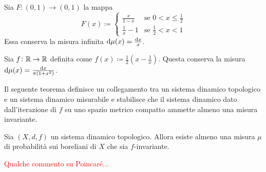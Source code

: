 \begin{exercise}
    Sia $ F\colon (0,1)\to (0,1) $ la mappa
    \[
        F(x) \coloneqq
        \begin{cases}
            \frac{x}{1-x}   & \text{se } 0 < x \leq \frac{1}{2} \\
            \frac{1}{x} - 1 & \text{se } \frac{1}{2} < x < 1
        \end{cases}
    \]
    Essa conserva la misura infinita $ \dif{\mu}(x) = \frac{\dif{x}}{x} $.
\end{exercise}

\begin{exercise}
    Sia $ f\colon \mathbb{R}\to\mathbb{R} $ definita come $ f(x) \coloneqq \frac{1}{2} \left( x - \frac{1}{x} \right) $. Questa conserva la misura $ \dif{\mu}(x) = \frac{\dif{x}}{\pi(1+x^2)} $.
\end{exercise}

Il seguente teorema definisce un collegamento tra un sistema dinamico topologico e un sistema dinamico misurabile e stabilisce che il sistema dinamico dato dall'iterazione di $ f $ su uno spazio metrico compatto ammette almeno una misura invariante. 

\begin{thm}
    Sia $ (X, d, f) $ un sistema dinamico topologico. Allora esiste almeno una misura $ \mu $ di probabilità sui boreliani di $ X $ che sia $ f $-invariante.
\end{thm}

\textcolor{red}{Qualche commento su Poincaré...}

